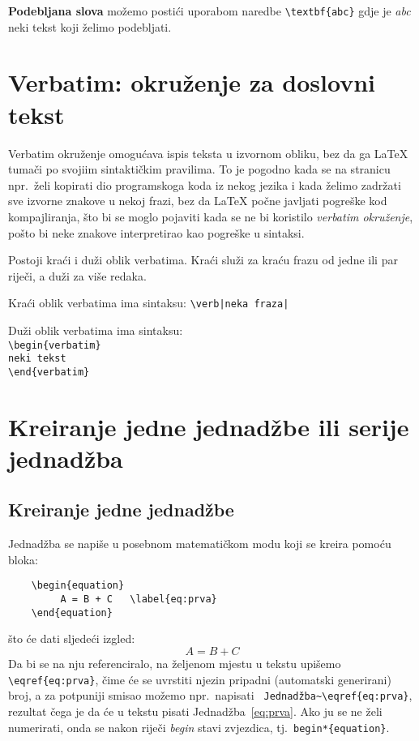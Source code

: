 \textbf{Podebljana slova} možemo postići uporabom naredbe {\color{red} \verb|\textbf{abc}|} gdje je \textit{abc} neki tekst koji želimo podebljati.

\section{Verbatim: okruženje za doslovni tekst}
Verbatim okruženje omogućava ispis teksta u izvornom obliku, bez da ga \LaTeX{} tumači po svojiim sintaktičkim pravilima. To je pogodno kada se na stranicu  npr.\ želi kopirati dio programskoga koda iz nekog jezika i kada želimo zadržati sve izvorne znakove u nekoj frazi, bez da \LaTeX{} počne javljati pogreške kod kompajliranja, što bi se moglo pojaviti kada se ne bi koristilo \emph{verbatim okruženje}, pošto bi neke znakove interpretirao kao pogreške u sintaksi.

Postoji kraći i duži oblik verbatima. Kraći služi za kraću frazu od jedne ili par riječi, a duži za više redaka.

\noindent Kraći oblik verbatima ima sintaksu: \verb+\verb|neka fraza|+

\noindent Duži oblik verbatima ima sintaksu:\\
\verb|\begin{verbatim}| \\
\verb|neki tekst| \\
\verb|\end{verbatim}| \\


\section{Kreiranje jedne jednadžbe ili serije jednadžba}

\subsection{Kreiranje jedne jednadžbe}
Jednadžba se napiše u posebnom matematičkom modu koji se kreira pomoću bloka:
\begin{verbatim}
	\begin{equation}
		 A = B + C   \label{eq:prva}
	\end{equation}
\end{verbatim}
što će dati sljedeći izgled:
\begin{equation}
	 A = B + C   \label{eq:prva}
\end{equation}
Da bi se na nju referenciralo, na željenom mjestu u tekstu upišemo \verb|\eqref{eq:prva}|, čime će se uvrstiti njezin pripadni (automatski generirani) broj, a za potpuniji smisao možemo npr.\ napisati \verb| Jednadžba~\eqref{eq:prva}|, rezultat čega je da će u tekstu pisati Jednadžba~\eqref{eq:prva}. 
Ako ju se ne želi numerirati, onda se nakon riječi \emph{begin} stavi zvjezdica, tj.\ \verb|begin*{equation}|.

